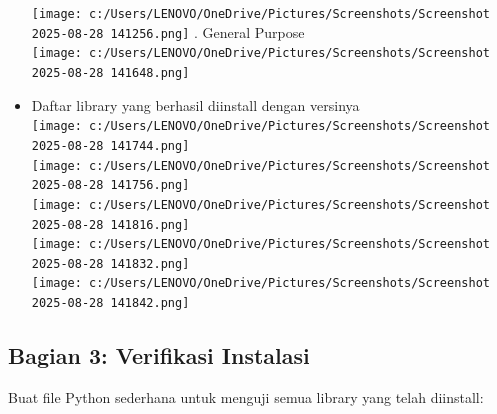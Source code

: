 \documentclass[11pt,a4paper]{article}
\begin{document}
\begin{itemize}
    \noindent
    \hspace{1cm}\texttt{[image: c:/Users/LENOVO/OneDrive/Pictures/Screenshots/Screenshot 2025-08-28 141256.png]}   
    . General Purpose \\
    \noindent
    \hspace{1cm}\texttt{[image: c:/Users/LENOVO/OneDrive/Pictures/Screenshots/Screenshot 2025-08-28 141648.png]}
    \item Daftar library yang berhasil diinstall dengan versinya \\
    \noindent
    \hspace{1cm}\texttt{[image: c:/Users/LENOVO/OneDrive/Pictures/Screenshots/Screenshot 2025-08-28 141744.png]} \\
    \noindent
    \hspace{1cm}\texttt{[image: c:/Users/LENOVO/OneDrive/Pictures/Screenshots/Screenshot 2025-08-28 141756.png]} \\
    \noindent
    \hspace{1cm}\texttt{[image: c:/Users/LENOVO/OneDrive/Pictures/Screenshots/Screenshot 2025-08-28 141816.png]} \\
    \noindent
    \hspace{1cm}\texttt{[image: c:/Users/LENOVO/OneDrive/Pictures/Screenshots/Screenshot 2025-08-28 141832.png]} \\
    \noindent
    \hspace{1cm}\texttt{[image: c:/Users/LENOVO/OneDrive/Pictures/Screenshots/Screenshot 2025-08-28 141842.png]}
    
\end{itemize}

\subsection{Bagian 3: Verifikasi Instalasi}
Buat file Python sederhana untuk menguji semua library yang telah diinstall:
\end{document}
